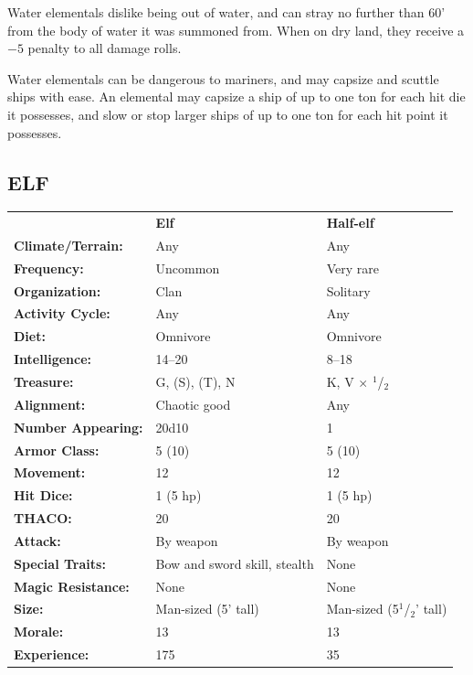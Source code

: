 \begin{multicols}{2}
Water elementals dislike being out of water, and can stray no further than 60' from the body of water it was summoned from. When on dry land, they receive a $-5$ penalty to all damage rolls.

Water elementals can be dangerous to mariners, and may capsize and scuttle ships with ease. An elemental may capsize a ship of up to one ton for each hit die it possesses, and slow or stop larger ships of up to one ton for each hit point it possesses. 

\noindent \begin{minipage}{\columnwidth}

\vspace{1em}

\subsection{ELF}

\noindent \begin{tabular}{p{}g{.24\columnwidth}p{.24\columnwidth}}
	& \textbf{Elf}	& \textbf{Half-elf}	\\
\textbf{Climate/Terrain:}	& Any	& Any \\
\textbf{Frequency:} 		& Uncommon 	& Very rare \\
\textbf{Organization:} 		& Clan	& Solitary \\
\textbf{Activity Cycle:} 	& Any	& Any \\
\textbf{Diet:} 				& Omnivore	& Omnivore \\
\textbf{Intelligence:} 		& 14--20	& 8--18 \\
\textbf{Treasure:} 			& G, (S), (T), N	& K, V $\times$ $^1$/$_2$ \\
\textbf{Alignment:} 		& Chaotic good	& Any \\
\hline
\textbf{Number Appearing:} 	& 20d10	& 1 \\
\textbf{Armor Class:} 		& 5 (10)	& 5 (10) \\
\textbf{Movement:} 			& 12	& 12 \\
\textbf{Hit Dice:} 			& 1 (5 hp)	& 1 (5 hp) \\
\textbf{THACO:} 			& 20	& 20 \\
\textbf{Attack:} 			& By weapon	& By weapon \\
\textbf{Special Traits:} & Bow and sword skill, stealth	& None \\
\textbf{Magic Resistance:} 	& None	& None \\
\textbf{Size:} 				& Man-sized (5' tall)	& Man-sized (5$^1$/$_2$' tall) \\
\textbf{Morale:} 			& 13	& 13 \\
\textbf{Experience:} 		& 175	& 35 \\ %
\end{tabular}


\end{minipage}
\end{multicols}
